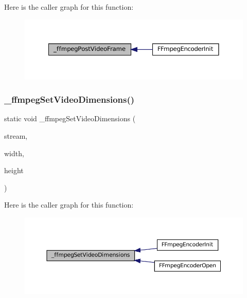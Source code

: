 Here is the caller graph for this function\+:
\nopagebreak
\begin{figure}[H]
\begin{center}
\leavevmode
\includegraphics[width=350pt]{ffmpeg-encoder_8c_a991130b3e2d7c60555b6daa8e2e14511_icgraph}
\end{center}
\end{figure}
\mbox{\label{ffmpeg-encoder_8c_a0ff04375648bb618edabd7296db53aac}} 
\subsubsection{\texorpdfstring{\+\_\+ffmpeg\+Set\+Video\+Dimensions()}{\_ffmpegSetVideoDimensions()}}
{\footnotesize\ttfamily static void \+\_\+ffmpeg\+Set\+Video\+Dimensions (\begin{DoxyParamCaption}\item[{struct m\+A\+V\+Stream $\ast$}]{stream,  }\item[{unsigned}]{width,  }\item[{unsigned}]{height }\end{DoxyParamCaption})\hspace{0.3cm}{\ttfamily [static]}}

Here is the caller graph for this function\+:
\nopagebreak
\begin{figure}[H]
\begin{center}
\leavevmode
\includegraphics[width=350pt]{ffmpeg-encoder_8c_a0ff04375648bb618edabd7296db53aac_icgraph}
\end{center}
\end{figure}
\mbox{\label{ffmpeg-encoder_8c_a9e740ab5a264bd7fe8dec61593d3b347}} 
